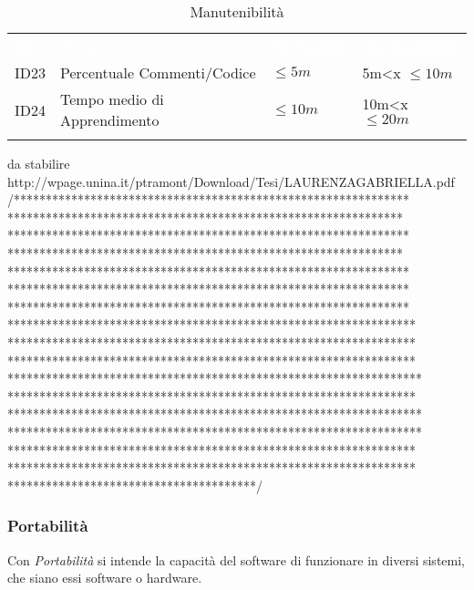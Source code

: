 \begin{longtable}{|C{.15\textwidth}|C{.24\textwidth}|C{.24\textwidth}|C{.24\textwidth}|}
\hline
{}\textbf{\textcolor{white}{ID}} & \textbf{\textcolor{white}{Nome}} & \textbf{\textcolor{white}{Ottimalità}} & \textbf{\textcolor{white}{Accettabilità}}\\
ID23 & Percentuale Commenti/Codice & $\leq 5m$ & 5m<x $\leq 10m$\\
\hline
{}ID24 & Tempo medio di Apprendimento & $\leq 10m$ & 10m<x $\leq 20m$ \\ 
\hline
\caption{Manutenibilità}
\label{Manutenibilità}
\end{longtable}
 da stabilire
http://wpage.unina.it/ptramont/Download/Tesi/LAURENZAGABRIELLA.pdf 
  /**************************************************************
 **************************************************************
 ***************************************************************
 **************************************************************
 ***************************************************************
 ***************************************************************
 ***************************************************************
 ****************************************************************
 ****************************************************************
 ****************************************************************
 *****************************************************************
 ****************************************************************
 *****************************************************************
 *****************************************************************
 ****************************************************************
 ****************************************************************
 ***************************************/


\subsubsection{Portabilità}

Con \textit{Portabilità} si intende la capacità del software di funzionare in diversi sistemi, che siano essi software o hardware. 

